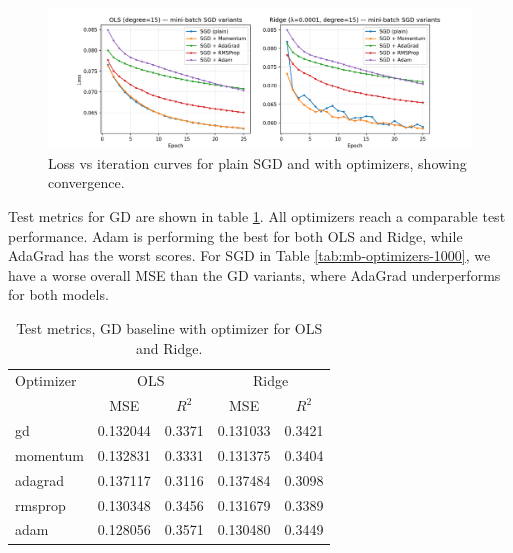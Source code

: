 \documentclass[amssymb,twocolumn,aps]{revtex4-2}
\begin{document}
 \begin{figure}[H]
    \centering
    \includegraphics[width=1\linewidth]{Project-1/Figures/Part_f_SGD_all_optimizers_loss_curves.png}
    \caption{Loss vs iteration curves for plain SGD and with optimizers, showing convergence.}
    \label{fig:loss_curves_sgd}
\end{figure}

Test metrics for GD are shown in table \ref{tab:test-metrics-optimizers}. All optimizers reach a comparable test performance. Adam is performing the best for both OLS and Ridge, while AdaGrad has the worst scores. For SGD in Table \ref{tab:mb-optimizers-1000}, we have a worse overall MSE than the GD variants, where AdaGrad underperforms for both models. 

\begin{table}[h!]
\caption{Test metrics, GD baseline with optimizer for OLS and Ridge.}
\label{tab:test-metrics-optimizers}
\begin{ruledtabular}
\begin{tabular}{lcccc}
Optimizer & \multicolumn{2}{c}{OLS} & \multicolumn{2}{c}{Ridge} \\
\colrule
 & MSE & $R^2$ & MSE & $R^2$ \\
\colrule
gd       & 0.132044 & 0.3371 & 0.131033 & 0.3421 \\
momentum & 0.132831 & 0.3331 & 0.131375 & 0.3404 \\
adagrad  & 0.137117 & 0.3116 & 0.137484 & 0.3098 \\
rmsprop  & 0.130348 & 0.3456 & 0.131679 & 0.3389 \\
adam     & 0.128056 & 0.3571 & 0.130480 & 0.3449 \\
\end{tabular}
\end{ruledtabular}
\end{table}
\end{document}
